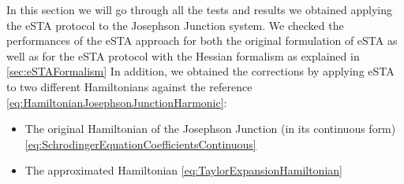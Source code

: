 In this section we will go through all the tests and results we obtained applying the eSTA protocol to the Josephson Junction system.
We checked the performances of the eSTA approach for both the original formulation of eSTA as well as for the eSTA protocol with the Hessian formalism as explained in \cref{sec:eSTAFormalism}
In addition, we obtained the corrections by applying eSTA to two different Hamiltonians against the reference \cref{eq:HamiltonianJosephsonJunctionHarmonic}:
\begin{itemize}
    \item The original Hamiltonian of the Josephson Junction (in its continuous form) \cref{eq:SchrodingerEquationCoefficientsContinuous}
    \item The approximated Hamiltonian \cref{eq:TaylorExpansionHamiltonian}
\end{itemize}
